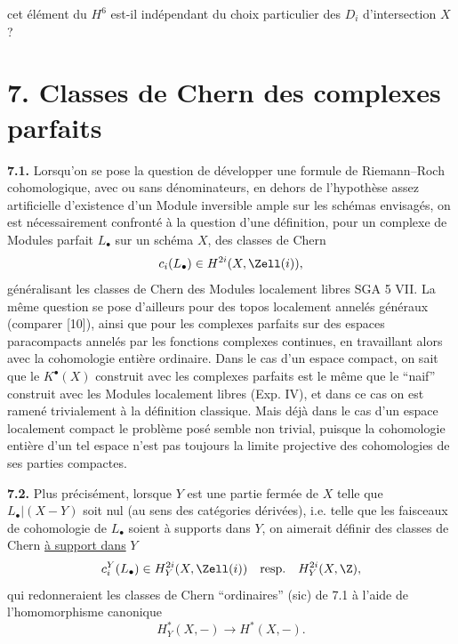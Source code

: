 
cet
élément du $H^6$ est-il indépendant du choix particulier des $D_i$ d'intersection $X$?

\section*{7. Classes de Chern des complexes parfaits}

\textbf{7.1.} Lorsqu'on se pose la question de développer une formule de Riemann--Roch cohomologique, avec ou sans dénominateurs, en dehors de l'hypothèse assez artificielle d'existence d'un Module inversible ample sur les schémas envisagés, on est nécessairement confronté à la question d'une définition, pour un complexe de Modules parfait $L_\bullet$ sur un schéma $X$, des classes de Chern
\[
 c_i(L_\bullet)\in H^{2i}(X,\Zell(i)),
\]
généralisant les classes de Chern des Modules localement libres SGA 5 VII. La même question se pose d'ailleurs pour des topos localement annelés généraux (comparer [10]), ainsi que pour les complexes parfaits sur des espaces paracompacts annelés par les fonctions complexes continues, en travaillant alors avec la cohomologie entière ordinaire. Dans le cas d'un espace compact, on sait que le $K^\bullet(X)$ construit avec les complexes parfaits est le même que le ``naif'' construit avec les Modules localement libres (Exp. IV), et dans ce cas on est ramené trivialement à la définition classique. Mais déjà dans le cas d'un espace localement compact le problème posé semble non trivial, puisque la cohomologie entière d'un tel espace n'est pas toujours la limite projective des cohomologies de ses parties compactes.

\textbf{7.2.} Plus précisément, lorsque $Y$ est une partie fermée de $X$ telle que $L_\bullet|(X-Y)$ soit nul (au sens des catégories dérivées), i.e. telle que les faisceaux de cohomologie de $L_\bullet$ soient à supports dans $Y$, on aimerait définir des classes de Chern \uline{à support dans} $Y$
\[
 c_i^Y(L_\bullet)\in H_Y^{2i}(X,\Zell(i))\quad\text{resp.}\quad H_Y^{2i}(X,\Z),
\]
qui redonneraient les classes de Chern ``ordinaires'' (sic) de 7.1 à l'aide de l'homomorphisme canonique
\[
 H_Y^*(X,-)\longrightarrow H^*(X,-).
\]
